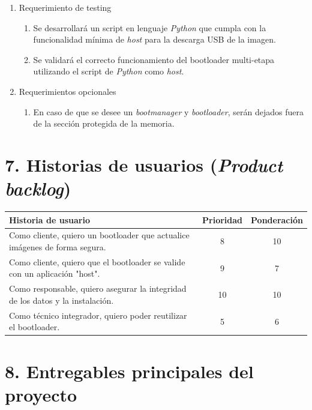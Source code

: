 \documentclass[
11pt, %
]{charter}
\begin{document}
\begin{enumerate}
\begin{enumerate}
		\end{enumerate}
	\item Requerimiento de testing
		\begin{enumerate}
			\item Se desarrollará un script en lenguaje \textit{Python} que cumpla con la funcionalidad mínima de \textit{host} para la descarga USB 
			de la imagen.
			\item Se validará el correcto funcionamiento del bootloader multi-etapa utilizando el script de \textit{Python} como \textit{host}.
		\end{enumerate}
	\item Requerimientos opcionales
		\begin{enumerate}
			\item En caso de que se desee un \textit{bootmanager} y \textit{bootloader}, serán dejados fuera de la sección protegida de la memoria.
		\end{enumerate}
\end{enumerate}

\section{7. Historias de usuarios (\textit{Product backlog})}
\label{sec:backlog}

\begin{table}[ht]
\begin{tabularx}{\linewidth}{@{}|X|c|c|@{}}
\hline
\rowcolor[HTML]{C0C0C0}
Historia de usuario 															& Prioridad & Ponderación	\\ \hline
Como cliente, quiero un bootloader que actualice imágenes de forma segura. 	  	& 8        	& 10      		\\ \hline
Como cliente, quiero que el bootloader se valide con un aplicación "host".    	& 9        	& 7       		\\ \hline
Como responsable, quiero asegurar la integridad de los datos y la instalación. 	& 10       	& 10      		\\ \hline
Como técnico integrador, quiero poder reutilizar el bootloader.               	& 5        	& 6       		\\ \hline
\end{tabularx}
\end{table}

\section{8. Entregables principales del proyecto}
\label{sec:entregables}
\end{document}
